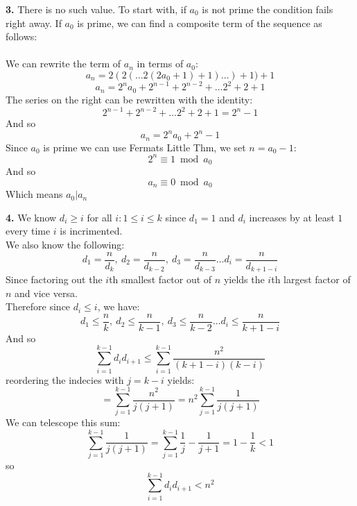 \documentclass[12pt]{article}
\newenvironment{ques}{\vspace{2 ex}}{\vspace{2 ex}}
\theoremstyle{definition}
\begin{document}
\begin{ques}
	\textbf{3.} There is no such value. To start with, if $a_0$ is not
		prime the condition fails right away. If $a_0$ is prime, we can
		find a composite term of the sequence as follows:\\
		\\
		We can rewrite the term of $a_n$ in terms of $a_0$:
		$$a_n = 2(2( \dots 2( 2a_0 + 1) + 1) \dots )+ 1) + 1$$
		$$a_n = 2^na_0 + 2^{n-1} + 2^{n-2} + \dots 2^2 + 2 + 1$$
		The series on the right can be rewritten with the identity:
		$$2^{n-1} + 2^{n-2} + \dots 2^2 + 2 + 1 = 2^n - 1$$
		And so
		$$a_n = 2^na_0 + 2^n - 1$$
		Since $a_0$ is prime we can use Fermats Little Thm, we set $n = a_0 - 1$:
		$$2^{n} \equiv 1\bmod{a_0}$$
		And so 
		$$a_n \equiv 0 \bmod{a_0}$$
		Which means $a_0 | a_n$
\end{ques}

\begin{ques}
	\textbf{4.}
		We know $d_i \geq i$ for all $i: 1 \leq i \leq k$ since $d_1 =
		1$ and $d_i$ increases by at least $1$ every time $i$ is
		incrimented.\\
		We also know the following:
		$$d_1 = \frac n {d_k}, \ d_2 = \frac n {d_{k - 2}}, \ d_3 =
		\frac n {d_{k - 3}} \dots d_i = \frac n {d_{k+1-i}}$$
		Since factoring out the $i$th smallest factor out of $n$ yields
		the $i$th largest factor of $n$ and vice versa.\\
		Therefore since $d_i \leq i$, we have:
		$$d_1 \leq \frac n {k}, \ d_2 \leq \frac n {k - 1}, \ d_3 \leq
		\frac n {k-2} \dots d_i \leq \frac n {k+1-i}$$
		And so 
		$$\sum_{i = 1}^{k-1} d_id_{i+1} \leq \sum_{i = 1}^{k-1}
		\frac{n^2}{(k+1 - i)(k - i)}$$
		reordering the indecies with $j = k- i$ yields:
		$$= \sum_{j = 1}^{k-1}\frac{n^2}{j(j+1)}= n^2\sum_{j =
		1}^{k-1}\frac{1}{j(j+1)}$$
		We can telescope this sum:
		$$\sum_{j = 1}^{k-1}\frac{1}{j(j+1)} = \sum_{j = 1}^{k-1}\frac1
		j -\frac 1 {j + 1} = 1 - \frac 1 k < 1$$
		so 
		$$\sum_{i = 1}^{k-1} d_id_{i+1} < n^2$$
\end{ques}
\end{document}
